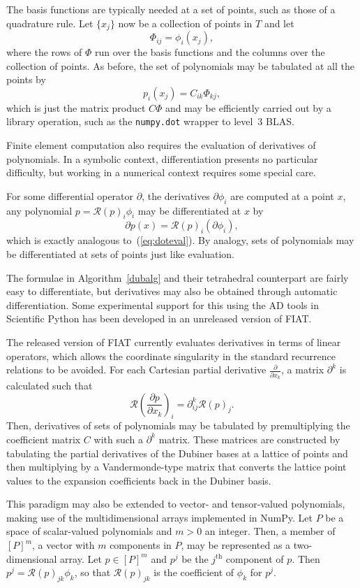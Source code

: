 The basis functions are typically needed at a set of points, such as
those of a quadrature rule.  Let \( \{ x_j \} \) now be a collection of
points in \( T \) and let
\[
  \Phi_{ij} = \phi_i(x_j),
\]
where the rows of \( \Phi \) run over the basis functions and the columns
over the collection of points.  As before, the set of polynomials may
be tabulated at all the points by
\[
p_i(x_j) = C_{ik} \Phi_{kj},
\]
which is just the matrix product \( C \Phi \) and may be efficiently
carried out by a library operation, such as the \texttt{numpy.dot}
wrapper to level~3 BLAS.

Finite element computation also requires the evaluation of derivatives
of polynomials.  In a symbolic context, differentiation presents no
particular difficulty, but working in a numerical context requires some
special care.

For some differential operator \( \partial \), the derivatives \(
\partial \phi_i \) are computed at a point \( x \), any polynomial \(
p = \mathcal{R}(p)_i \phi_i \) may be differentiated at \( x \) by
\[
\partial p(x) = \mathcal{R}(p)_i (\partial \phi_i),
\]
which is exactly analogous to~(\ref{eq:doteval}).  By analogy, sets of
polynomials may be differentiated at sets of points just like evaluation.

The formulae in Algorithm~\ref{dubalg} and their tetrahedral counterpart
are fairly easy to differentiate, but derivatives may also be obtained
through automatic differentiation.  Some experimental support for
this using the AD tools in Scientific Python has been developed in an
unreleased version of FIAT.

The released version of FIAT currently evaluates derivatives in terms
of linear operators, which allows the coordinate singularity in the
standard recurrence relations to be avoided.  For each Cartesian partial
derivative \( \frac{\partial}{\partial x_k} \), a matrix \( \partial^k \)
is calculated such that
\[
\mathcal{R}\left(\frac{\partial p}{\partial x_k}\right)_i
= \partial^k_{ij} \mathcal{R}(p)_j.
\]
Then, derivatives of sets of polynomials may be tabulated by
premultiplying the coefficient matrix \( C \) with such a \( \partial^k
\) matrix.  These matrices are constructed by tabulating the partial
derivatives of the Dubiner bases at a lattice of points and then
multiplying by a Vandermonde-type matrix that converts the lattice point
values to the expansion coefficients back in the Dubiner basis.

This paradigm may also be extended to vector- and tensor-valued
polynomials, making use of the multidimensional arrays implemented in
NumPy. Let \( P \) be a space of scalar-valued polynomials and
\( m > 0 \) an integer.  Then, a member of \( [P]^m \), a vector with \(
m \) components in \( P \), may be represented as a two-dimensional array.
Let \( p \in [P]^m \) and \( p^j \) be the \( j^\mathrm{th} \) component
of \( p \).  Then \( p^j = \mathcal{R}(p)_{jk} \phi_k \), so that \(
\mathcal{R}(p)_{jk} \) is the coefficient of \( \phi_k \) for \( p^j \).


